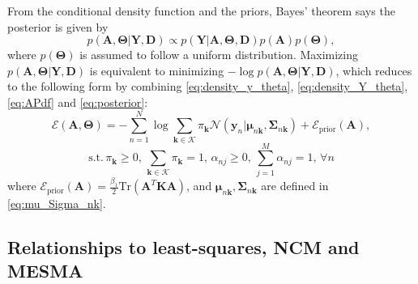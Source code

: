 \documentclass[twocolumn,english]{IEEEtran}
\theoremstyle{plain}
\begin{document}
From the conditional density function and the priors, Bayes' theorem
says the posterior is given by
\begin{equation}
p\left(\mathbf{A},\boldsymbol{\Theta}\vert\mathbf{Y},\mathbf{D}\right)\propto p\left(\mathbf{Y}\vert\mathbf{A},\boldsymbol{\Theta},\mathbf{D}\right)p\left(\mathbf{A}\right)p\left(\boldsymbol{\Theta}\right),\label{eq:posterior}
\end{equation}
where $p\left(\boldsymbol{\Theta}\right)$ is assumed to follow a
uniform distribution. Maximizing $p\left(\mathbf{A},\boldsymbol{\Theta}\vert\mathbf{Y},\mathbf{D}\right)$
is equivalent to minimizing $-\log p\left(\mathbf{A},\boldsymbol{\Theta}\vert\mathbf{Y},\mathbf{D}\right)$,
which reduces to the following form by combining \eqref{eq:density_y_theta},
\eqref{eq:density_Y_theta}, \eqref{eq:APdf} and \eqref{eq:posterior}:
\begin{equation}
\mathcal{E}\left(\mathbf{A},\boldsymbol{\Theta}\right)=-\sum_{n=1}^{N}\log\sum_{\mathbf{k}\in\mathcal{K}}\pi_{\mathbf{k}}\mathcal{N}\left(\mathbf{y}_{n}\vert\boldsymbol{\mu}_{n\mathbf{k}},\boldsymbol{\Sigma}_{n\mathbf{k}}\right)+\mathcal{E}_{\text{prior}}(\mathbf{A}),\label{eq:obj_fun}
\end{equation}
\[
\text{s.t.}\,\pi_{\mathbf{k}}\ge0,\,\sum_{\mathbf{k}\in\mathcal{K}}\pi_{\mathbf{k}}=1,\,\alpha_{nj}\ge0,\,\sum_{j=1}^{M}\alpha_{nj}=1,\,\forall n
\]
where $\mathcal{E}_{\text{prior}}(\mathbf{A})=\frac{\beta_{1}}{2}\text{Tr}\left(\mathbf{A}^{T}\mathbf{K}\mathbf{A}\right)$,
and $\boldsymbol{\mu}_{n\mathbf{k}},\boldsymbol{\Sigma}_{n\mathbf{k}}$
are defined in \eqref{eq:mu_Sigma_nk}.

\subsection{Relationships to least-squares, NCM and MESMA}
\end{document}

